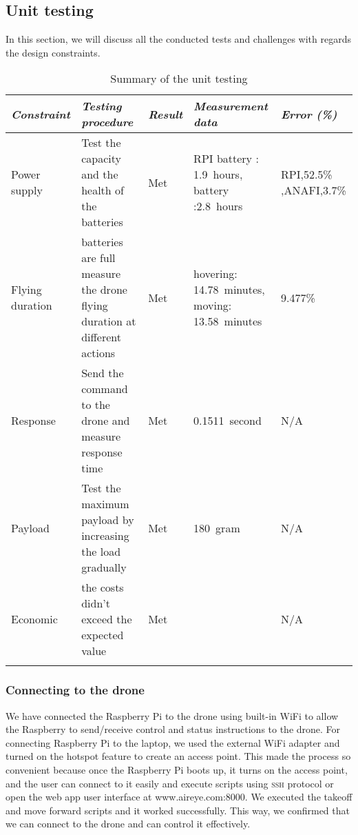 \documentclass[../main.tex]{subfiles}
\begin{document}
\subsection{Unit testing}
In this section, we will discuss all the conducted tests 
and challenges with regards the design constraints. 

\begin{table}[H]
	\centering
	\caption{Summary of the unit testing}
	\label{tab:unit-testing-summary}
	\begin{tabularx}{\textwidth}{ X X l X l }
		\toprule
		\textit{Constraint} 
		& \textit{Testing procedure} 
		& \textit{Result}
		& \textit{Measurement data} 
		& \textit{Error (\%)} \\
		
		\midrule
		
		
		\raggedright Power supply    
		& Test the capacity and the health of the batteries
		& Met
		& RPI battery : \SI{1.9}{hours}, \anafi battery :\SI{2.8}{hours}
		& RPI,52.5\%
		,ANAFI,3.7\% \\
		\addlinespace
		
		\raggedright Flying duration
		& batteries are full measure the drone flying duration at different actions
		& Met
		& hovering: \SI{14.78}{minutes},		moving: \SI{13.58}{minutes} 
		& 9.477\%\\
		\addlinespace
		
		\raggedright Response    
		& Send the command to the drone and measure response time
		& Met
		& \SI{0.1511}{second}
		& N/A \\
		\addlinespace

		\raggedright Payload     
		& Test the maximum payload by increasing the load gradually
		& Met
		& \SI{180}{gram}
		& N/A \\
		\addlinespace
		
		\raggedright Economic     
		& the costs didn't exceed the expected value 
		& Met
		& \qar{3800}
		& N/A \\
		\addlinespace		
		\bottomrule		
	\end{tabularx}
\end{table}

\subsubsection{Connecting to the drone}

We have connected the
Raspberry Pi to the drone using built-in WiFi
to allow the Raspberry to send/receive control and status 
instructions to the drone. 
For connecting Raspberry Pi to the laptop, 
we used the external WiFi adapter and turned 
on the hotspot feature to create an access point.
This made the process so convenient because 
once the Raspberry Pi boots up, it turns on the 
access point, and the user can connect to it 
easily and execute scripts using \textsc{ssh} 
protocol or open the web app user interface 
at www.aireye.com:8000. We executed the takeoff 
and move forward scripts and it worked successfully.
This way, we confirmed that we can connect to the drone and can control it effectively.
\end{document}
